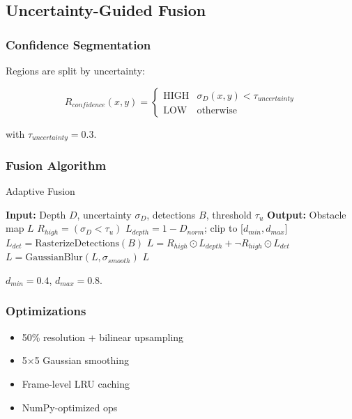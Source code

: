 \documentclass[12pt,oneside]{book}
\begin{document}
\subsection{Uncertainty-Guided Fusion}

\subsubsection{Confidence Segmentation}

Regions are split by uncertainty:

\begin{equation}
R_{confidence}(x,y) =
\begin{cases}
\text{HIGH} & \sigma_D(x,y) < \tau_{uncertainty} \\
\text{LOW} & \text{otherwise}
\end{cases}
\label{eq:confidence_segmentation}
\end{equation}

with $\tau_{uncertainty} = 0.3$.

\subsubsection{Fusion Algorithm}

\begin{algorithm}
\caption{Adaptive Fusion}
\begin{algorithmic}
\STATE \textbf{Input:} Depth $D$, uncertainty $\sigma_D$, detections $B$, threshold $\tau_u$
\STATE \textbf{Output:} Obstacle map $L$
\STATE $R_{high} = (\sigma_D < \tau_u)$
\STATE $L_{depth} = 1 - D_{norm}$; clip to [$d_{min}, d_{max}$]
\STATE $L_{det} = \text{RasterizeDetections}(B)$
\STATE $L = R_{high} \odot L_{depth} + \neg R_{high} \odot L_{det}$
\STATE $L = \text{GaussianBlur}(L, \sigma_{smooth})$
\RETURN $L$
\end{algorithmic}
\end{algorithm}

$d_{min}=0.4$, $d_{max}=0.8$.

\subsubsection{Optimizations}
\begin{itemize}
\item 50\% resolution + bilinear upsampling
\item 5$\times$5 Gaussian smoothing
\item Frame-level LRU caching
\item NumPy-optimized ops
\end{itemize}
\end{document}
